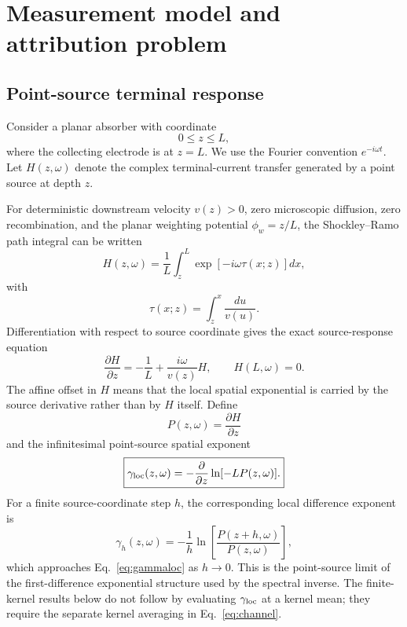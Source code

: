 \documentclass[aps,pra,twocolumn,superscriptaddress,nofootinbib]{revtex4-2}
\begin{document}
\section{Measurement model and attribution problem}
\label{sec:model}

\subsection{Point-source terminal response}

Consider a planar absorber with coordinate
\begin{equation}
0\le z\le L,
\end{equation}
where the collecting electrode is at $z=L$. We use the Fourier convention $e^{-i\omega t}$. Let $H(z,\omega)$ denote the complex terminal-current transfer generated by a point source at depth $z$.

For deterministic downstream velocity $v(z)>0$, zero microscopic diffusion, zero recombination, and the planar weighting potential $\phi_w=z/L$, the Shockley--Ramo path integral \cite{shockley1938,ramo1939} can be written
\begin{equation}
H(z,\omega)
=\frac{1}{L}\int_z^L
\exp\left[-i\omega\tau(x;z)\right]dx,
\label{eq:Hpath}
\end{equation}
with
\begin{equation}
\tau(x;z)=\int_z^x\frac{du}{v(u)}.
\end{equation}
Differentiation with respect to source coordinate gives the exact source-response equation
\begin{equation}
\boxed{
\frac{\partial H}{\partial z}
=-\frac{1}{L}+\frac{i\omega}{v(z)}H,
\qquad H(L,\omega)=0.
}
\label{eq:ramoode}
\end{equation}
The affine offset in $H$ means that the local spatial exponential is carried by the source derivative rather than by $H$ itself. Define
\begin{equation}
P(z,\omega)=\frac{\partial H}{\partial z}
\end{equation}
and the infinitesimal point-source spatial exponent
\begin{equation}
\boxed{
\gamma_{\rm loc}(z,\omega)
=-\frac{\partial}{\partial z}
\ln[-L P(z,\omega)].
}
\label{eq:gammaloc}
\end{equation}
For a finite source-coordinate step $h$, the corresponding local difference exponent is
\begin{equation}
\gamma_h(z,\omega)
=-\frac{1}{h}
\ln\!\left[\frac{P(z+h,\omega)}{P(z,\omega)}\right],
\end{equation}
which approaches Eq.~\eqref{eq:gammaloc} as $h\rightarrow0$.  This is the point-source limit of the first-difference exponential structure used by the spectral inverse.  The finite-kernel results below do not follow by evaluating $\gamma_{\rm loc}$ at a kernel mean; they require the separate kernel averaging in Eq.~\eqref{eq:channel}.
\end{document}
